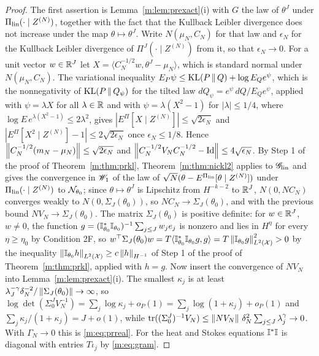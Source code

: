 \begin{proof}
The first assertion is Lemma~\ref{m:lem:prexact}(i) with $G$ the law of $\theta^J$ under $\Pi_{\rm lin}(\cdot\mid Z^{(N)})$, together with the fact that the Kullback Leibler divergence does not increase under the map $\theta\mapsto\theta^J$. Write $N(\mu_N,C_N)$ for that law and $\epsilon_N$ for the Kullback Leibler divergence of $\Pi^J(\cdot\mid Z^{(N)})$ from it, so that $\epsilon_N\to0$. For a unit vector $w\in\mathbb{R}^J$ let $X=\langle C_N^{-1/2}w,\theta^J-\mu_N\rangle$, which is standard normal under $N(\mu_N,C_N)$. The variational inequality $E_P\psi\le\mathrm{KL}(P\,\|\,Q)+\log E_Qe^\psi$, which is the nonnegativity of $\mathrm{KL}(P\,\|\,Q_\psi)$ for the tilted law $dQ_\psi=e^\psi\,dQ/E_Qe^\psi$, applied with $\psi=\lambda X$ for all $\lambda\in\mathbb{R}$ and with $\psi=\lambda(X^2-1)$ for $|\lambda|\le1/4$, where $\log E\,e^{\lambda(X^2-1)}\le2\lambda^2$, gives $|E^\Pi[X\mid Z^{(N)}]|\le\sqrt{2\epsilon_N}$ and $|E^\Pi[X^2\mid Z^{(N)}]-1|\le2\sqrt{2\epsilon_N}$ once $\epsilon_N\le1/8$. Hence $\left\|C_N^{-1/2}(m_N-\mu_N)\right\|\le\sqrt{2\epsilon_N}$ and $\left\|C_N^{-1/2}V_NC_N^{-1/2}-\operatorname{Id}\right\|\le4\sqrt{\epsilon_N}$. By Step 1 of the proof of Theorem~\ref{m:thm:prkl}, Theorem~\ref{m:thm:nickl2} applies to $\mathscr{G}_{\rm lin}$ and gives the convergence in $\mathscr{W}_1$ of the law of $\sqrt N(\theta-E^{\Pi_{\rm lin}}[\theta\mid Z^{(N)}])$ under $\Pi_{\rm lin}(\cdot\mid Z^{(N)})$ to $\mathcal{N}_{\theta_0}$; since $\theta\mapsto\theta^J$ is Lipschitz from $H^{-k-2}$ to $\mathbb{R}^J$, $N(0,NC_N)$ converges weakly to $N(0,\Sigma_J(\theta_0))$, so $NC_N\to\Sigma_J(\theta_0)$, and with the previous bound $NV_N\to\Sigma_J(\theta_0)$. The matrix $\Sigma_J(\theta_0)$ is positive definite: for $w\in\mathbb{R}^J$, $w\ne0$, the function $g=(\mathbb{I}^*_{\theta_0}\mathbb{I}_{\theta_0})^{-1}\sum_{j\le J}w_je_j$ is nonzero and lies in $H^\eta$ for every $\eta\ge\eta_0$ by Condition 2F, so $w^\top\Sigma_J(\theta_0)w=T\langle\mathbb{I}^*_{\theta_0}\mathbb{I}_{\theta_0}g,g\rangle=T\left\|\mathbb{I}_{\theta_0}g\right\|^2_{L^2(\mathcal X)}>0$ by the inequality $\left\|\mathbb{I}_{\theta_0}h\right\|_{L^2(\mathcal X)}\ge c\left\|h\right\|_{H^{-1}}$ of Step 1 of the proof of Theorem~\ref{m:thm:prkl}, applied with $h=g$. Now insert the convergence of $NV_N$ into Lemma~\ref{m:lem:prexact}(i). The smallest $\kappa_j$ is at least $\lambda_J^{-\gamma}\delta_N^{-2}/\left\|\Sigma_J(\theta_0)\right\|\to\infty$, so $\log\det(\Sigma^J_0V_N^{-1})=\sum_j\log\kappa_j+o_P(1)=\sum_j\log(1+\kappa_j)+o_P(1)$ and $\sum_j\kappa_j/(1+\kappa_j)=J+o(1)$, while $\mathrm{tr}((\Sigma^J_0)^{-1}V_N)\le\left\|NV_N\right\|\,\delta_N^2\sum_{j\le J}\lambda_j^\gamma\to0$. With $\Gamma_N\to0$ this is \eqref{m:eq:prreal}. For the heat and Stokes equations $\mathbb{I}^*\mathbb{I}$ is diagonal with entries $T\iota_j$ by \eqref{m:eq:gram}.
\end{proof}

